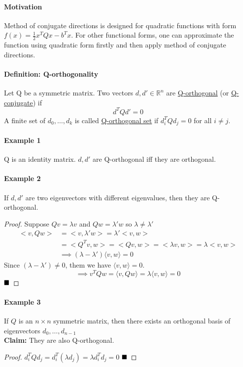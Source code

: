 \documentclass[11pt]{article}
\newcommand{\tb}[1]{\textbf{#1}}
\newcommand{\real}[0]{\mathbb{R}}
\newcommand{\under}[1]{\underline{#1}}
\newcommand{\qed}[0]{$\hfill\blacksquare$}
\begin{document}
\paragraph{Motivation}
Method of conjugate directions is designed for quadratic functions with form $f(x) = \frac{1}{2}x^TQx - b^Tx$. For other functional forms, one can approximate the function using quadratic form firstly and then apply method of conjugate directions.

\paragraph{Definition: Q-orthogonality}
Let Q be a symmetric matrix. Two vectors $d, d' \in \real^n$ are \under{Q-orthogonal} (or \under{Q-conjugate}) if $$d^TQd' = 0$$
A finite set of $d_0, \hdots, d_k$ is called \under{Q-orthogonal set} if $d_i^TQd_j = 0$ for all $i \neq j$.

\paragraph{Example 1}
Q is an identity matrix. $d, d'$ are Q-orthogonal iff they are orthogonal.

\paragraph{Example 2}
If $d, d'$ are two eigenvectors with different eigenvalues, then they are Q-orthogonal. \\
\begin{proof}
Suppose $Qv = \lambda v$ and $Qw = \lambda' w$ so $\lambda \neq \lambda'$
	\begin{align}
		<v, Qw> &= <v, \lambda'w> = \lambda'<v,w> \\
		&= <Q^Tv, w> = <Qv, w> = <\lambda v, w> = \lambda <v,w>\\
		&\implies (\lambda - \lambda')\langle v, w \rangle  = 0
	\end{align}
	Since $(\lambda - \lambda') \neq 0$, them we have $\langle v, w \rangle  = 0$.
	$$\implies v^TQw = \langle v, Qw \rangle = \lambda \langle v, w \rangle  = 0$$\qed
\end{proof}

\paragraph{Example 3}
If $Q$ is an $n \times n$ symmetric matrix, then there exists an orthogonal basis of eigenvectors $d_0, \hdots, d_{n-1}$ \\
\tb{Claim: } They are also Q-orthogonal. \\
\begin{proof}
	$d_i^TQd_j = d_i^T(\lambda d_j) = \lambda d_i^Td_j = 0$ \qed
\end{proof}
\end{document}
